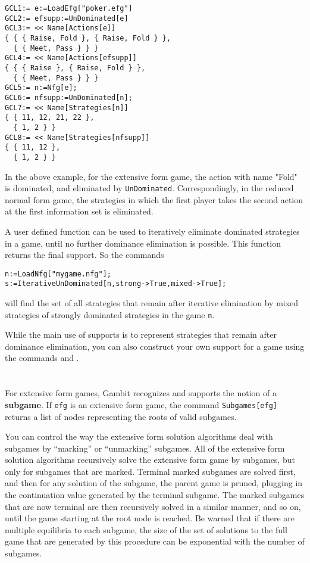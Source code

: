 \begin{verbatim}
GCL1:= e:=LoadEfg["poker.efg"]
GCL2:= efsupp:=UnDominated[e]
GCL3:= << Name[Actions[e]]
{ { { Raise, Fold }, { Raise, Fold } },
  { { Meet, Pass } } }
GCL4:= << Name[Actions[efsupp]]
{ { { Raise }, { Raise, Fold } },
  { { Meet, Pass } } }
GCL5:= n:=Nfg[e];
GCL6:= nfsupp:=UnDominated[n];
GCL7:= << Name[Strategies[n]]
{ { 11, 12, 21, 22 },
  { 1, 2 } }
GCL8:= << Name[Strategies[nfsupp]]
{ { 11, 12 },
  { 1, 2 } }
\end{verbatim}

In the above example, for the extensive form game, the action with
name "Fold" is dominated, and eliminated by \verb+UnDominated+.
Correspondingly, in the reduced normal form game, the strategies in
which the first player takes the second action at the first
information set is eliminated.  

A user defined function  can be used to
iteratively eliminate dominated strategies in a game, until no further
dominance elimination is possible.  This function returns the final
support.  So the commands

\begin{verbatim}
n:=LoadNfg["mygame.nfg"];
s:=IterativeUnDominated[n,strong->True,mixed->True];
\end{verbatim}

\noindent
will find the set of all strategies that remain after iterative
elimination by mixed strategies of strongly dominated strategies in
the game \verb+n+.

While the main use of supports is to represent strategies that
remain after dominance elimination, you can also construct your own
support for a game using the commands  and
.

\section{}

For extensive form games, Gambit recognizes and supports the notion of
a {\bf subgame}.  If \verb+efg+ is an extensive form game, the
command \verb+Subgames[efg]+ returns a list of nodes
representing the roots of valid subgames.

You can control the way the extensive form solution algorithms deal
with subgames by ``marking'' or ``unmarking'' subgames.  All of the
extensive form solution algorithms recursively solve the extensive
form game by subgames, but only for subgames that are marked.  Terminal
marked subgames are solved first, and then for any solution of the
subgame, the parent game is pruned, plugging in the continuation value
generated by the terminal subgame.  The marked subgames that are now
terminal are then recursively solved in a similar manner, and so on,
until the game starting at the root node is reached.  Be warned that
if there are multiple equilibria to each subgame, the size of the set
of solutions to the full game that are generated by this procedure can
be exponential with the number of subgames.

